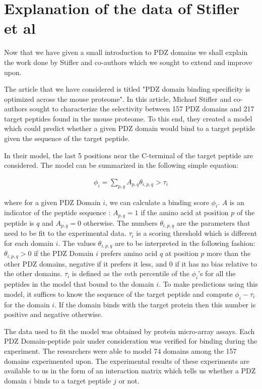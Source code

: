 \documentclass[a4paper, 12pt]{article}
\begin{document}
	\section{Explanation of the data of Stifler et al}

	Now that we have given a small introduction to PDZ domains we shall explain the work done by Stifler and co-authors which we sought to extend and improve upon.

	The article that we have considered is titled "PDZ domain binding specificity is optimized across the mouse proteome". In this article, Michael Stifler and co-authors sought to characterize the selectivity between 157 PDZ domains and 217 target peptides found in the mouse proteome. To this end, they created a model which could predict whether a given PDZ domain would bind to a target peptide given the sequence of the target peptide.

	In their model, the last 5 positions near the C-terminal of the target peptide are considered. The model can be summarized in the following simple equation: 

	\begin{align}
	\label{model_base}
	\phi_{i} = \sum_{p,q} A_{p,q} \theta_{i,p,q} > \tau_{i}
	\end{align}

	where for a given PDZ Domain $i$, we can calculate a binding score $\phi_{i}$. $A$ is an indicator of the peptide sequence : $A_{p,q} =1$ if the amino acid at position $p$ of the peptide is $q$ and $A_{p,q} =0$ otherwise. The numbers $\theta_{i,p,q}$ are the parameters that need to be fit to the experimental data. $\tau_{i}$ is a scoring threshold which is different for each domain $i$. The values $\theta_{i,p,q}$ are to be interpreted in the following fashion: $\theta_{i,p,q} > 0$ if the PDZ Domain $i$ prefers amino acid $q$ at position $p$ more than the other PDZ domains, negative if it prefers it less, and 0 if it has no bias relative to the other domains. $\tau_{i}$ is defined as the $m$th percentile of the $\phi_{i}$'s for all the peptides in the model that bound to the domain $i$. To make predictions using this model, it suffices to know the sequence of the target peptide and compute $\phi_{i} - \tau_{i}$ for the domain $i$. If the domain binds with the target protein then this number is positive and negative otherwise. 

	The data used to fit the model was obtained by protein micro-array assays. Each PDZ Domain-peptide pair under consideration was verified for binding during the experiment. The researchers were able to model 74 domains among the 157 domains experimented upon. The experimental results of these experiments are available to us in the form of an interaction matrix which tells us whether a PDZ domain $i$ binds to a target peptide $j$ or not. 
\end{document}
